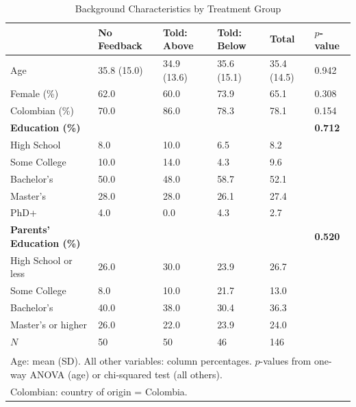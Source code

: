 \begin{table}[!h]
\centering
\caption{Background Characteristics by Treatment Group \label{tab:background}}
\centering
\begin{tabular}[t]{llllll}
\toprule
 & No Feedback & Told: Above & Told: Below & Total & $p$-value\\
\midrule
Age & 35.8 (15.0) & 34.9 (13.6) & 35.6 (15.1) & 35.4 (14.5) & 0.942\\
Female (\%) & 62.0 & 60.0 & 73.9 & 65.1 & 0.308\\
Colombian (\%) & 70.0 & 86.0 & 78.3 & 78.1 & 0.154\\
\textbf{Education (\%)} & \textbf{} & \textbf{} & \textbf{} & \textbf{} & \textbf{0.712}\\
\quad High School & 8.0 & 10.0 & 6.5 & 8.2 & \\
\addlinespace
\quad Some College & 10.0 & 14.0 & 4.3 & 9.6 & \\
\quad Bachelor's & 50.0 & 48.0 & 58.7 & 52.1 & \\
\quad Master's & 28.0 & 28.0 & 26.1 & 27.4 & \\
\quad PhD+ & 4.0 & 0.0 & 4.3 & 2.7 & \\
\textbf{Parents' Education (\%)} & \textbf{} & \textbf{} & \textbf{} & \textbf{} & \textbf{0.520}\\
\addlinespace
\quad High School or less & 26.0 & 30.0 & 23.9 & 26.7 & \\
\quad Some College & 8.0 & 10.0 & 21.7 & 13.0 & \\
\quad Bachelor's & 40.0 & 38.0 & 30.4 & 36.3 & \\
\quad Master's or higher & 26.0 & 22.0 & 23.9 & 24.0 & \\
$N$ & 50 & 50 & 46 & 146 & \\
\bottomrule
\multicolumn{6}{l}{\textsuperscript{} Age: mean (SD). All other variables: column percentages. $p$-values from one-way ANOVA (age) or chi-squared test (all others).}\\
\multicolumn{6}{l}{Colombian: country of origin = Colombia.}\\
\end{tabular}
\end{table}
